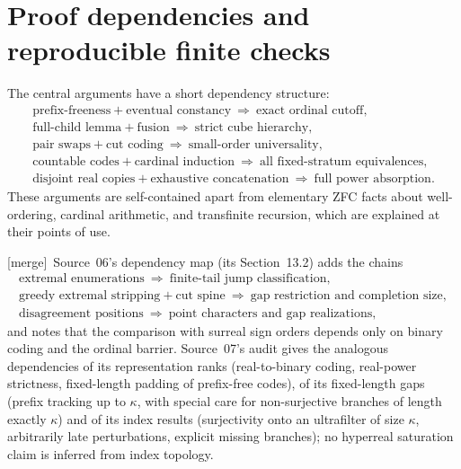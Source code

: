 \documentclass[11pt,a4paper]{article}
\theoremstyle{definition}
\theoremstyle{remark}
\newcommand{\merge}{\textsf{[merge]}}
\begin{document}
\appendix
\section{Proof dependencies and reproducible finite checks}\label{lwo:app:checks}

The central arguments have a short dependency structure:
\[
\begin{gathered}
 \text{prefix-freeness} + \text{eventual constancy}
       \ \Longrightarrow\ \text{exact ordinal cutoff},\\
 \text{full-child lemma} + \text{fusion}
       \ \Longrightarrow\ \text{strict cube hierarchy},\\
 \text{pair swaps} + \text{cut coding}
       \ \Longrightarrow\ \text{small-order universality},\\
 \text{countable codes} + \text{cardinal induction}
       \ \Longrightarrow\ \text{all fixed-stratum equivalences},\\
 \text{disjoint real copies} + \text{exhaustive concatenation}
       \ \Longrightarrow\ \text{full power absorption}.
\end{gathered}
\]
These arguments are self-contained apart from elementary ZFC facts about
well-ordering, cardinal arithmetic, and transfinite recursion, which are
explained at their points of use.

\merge\ Source~06's dependency map (its Section~13.2) adds the chains
\[
\begin{gathered}
 \text{extremal enumerations}\ \Longrightarrow\ \text{finite-tail jump classification},\\
 \text{greedy extremal stripping} + \text{cut spine}
   \ \Longrightarrow\ \text{gap restriction and completion size},\\
 \text{disagreement positions}
   \ \Longrightarrow\ \text{point characters and gap realizations},
\end{gathered}
\]
and notes that the comparison with surreal sign orders depends only on binary
coding and the ordinal barrier. Source~07's audit gives the analogous
dependencies of its representation ranks (real-to-binary coding, real-power
strictness, fixed-length padding of prefix-free codes), of its fixed-length
gaps (prefix tracking up to $\kappa$, with special care for non-surjective
branches of length exactly $\kappa$) and of its index results (surjectivity
onto an ultrafilter of size $\kappa$, arbitrarily late perturbations, explicit
missing branches); no hyperreal saturation claim is inferred from index
topology.
\end{document}
